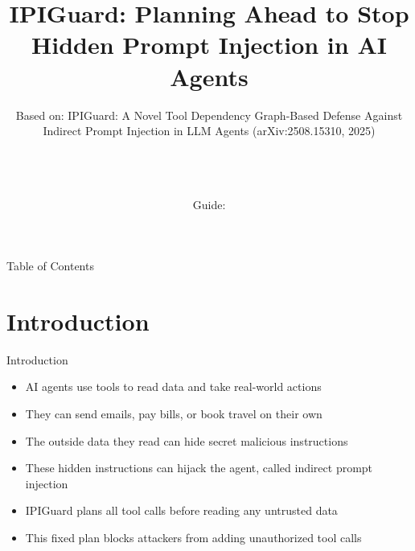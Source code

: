 \documentclass[10pt]{beamer}
\title[B.Tech Seminar]{IPIGuard: Planning Ahead to Stop Hidden Prompt Injection in AI Agents}
\subtitle{Based on: IPIGuard: A Novel Tool Dependency Graph-Based Defense Against Indirect Prompt Injection in LLM Agents (arXiv:2508.15310, 2025)}
\author[\studentname\ (\shortinst)]{\studentname \\ \small \rollno \\ \small \rollclass \\ \small Guide: \guidename}
\institute[]{\deptname \\ \collegename}
\date{\seminardate}
\begin{document}
\begin{frame}[plain]
  \titlepage
\end{frame}
\begin{frame}{Table of Contents}
  \tableofcontents
\end{frame}
\section{Introduction}
\begin{frame}{Introduction}
\begin{itemize}
  \item AI agents use tools to read data and take real-world actions
  \item They can send emails, pay bills, or book travel on their own
  \item The outside data they read can hide secret malicious instructions
  \item These hidden instructions can hijack the agent, called indirect prompt injection
  \item IPIGuard plans all tool calls before reading any untrusted data
  \item This fixed plan blocks attackers from adding unauthorized tool calls
\end{itemize}
\end{frame}
\end{document}
